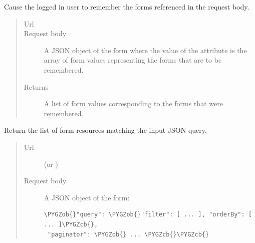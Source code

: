 \documentclass[letterpaper,10pt,english]{sphinxmanual}
\def\PYGZob{\char`\{}
\def\PYGZcb{\char`\}}
\begin{document}
\begin{fulllineitems}
\begin{fulllineitems}
\begin{quote}
\begin{description}
\end{description}\end{quote}

\end{fulllineitems}


\begin{fulllineitems}
\label{api:onlinelinguisticdatabase.controllers.forms.FormsController.remember}
Cause the logged in user to remember the forms referenced in the request body.
\begin{quote}\begin{description}
\item[{Url }] \leavevmode
{}

\item[{Request body}] \leavevmode
A JSON object of the form  where
the value of the  attribute is the array of form 
values representing the forms that are to be remembered.

\item[{Returns}] \leavevmode
A list of form  values corresponding to the forms that
were remembered.

\end{description}\end{quote}

\end{fulllineitems}


\begin{fulllineitems}
\label{api:onlinelinguisticdatabase.controllers.forms.FormsController.search}
Return the list of form resources matching the input JSON query.
\begin{quote}\begin{description}
\item[{Url }] \leavevmode
{} (or )

\item[{Request body}] \leavevmode
A JSON object of the form:

\begin{Verbatim}[commandchars=\\\{\}]
\PYGZob{}"query": \PYGZob{}"filter": [ ... ], "orderBy": [ ... ]\PYGZcb{},
 "paginator": \PYGZob{} ... \PYGZcb{}\PYGZcb{}
\end{Verbatim}


\end{description}
\end{quote}
\end{fulllineitems}
\end{fulllineitems}
\end{document}
